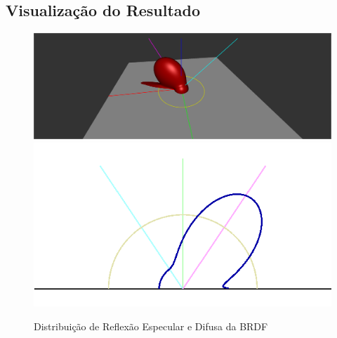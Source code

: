 \subsection{Visualização do Resultado}
\begin{figure}[H]
    \caption{\small{Distribuição de Reflexão Especular e Difusa da BRDF}}\label{fig-ward-eqlang}
    \vspace{42px}
  \includegraphics[width=\linewidth]{./Imagens/brdfs/ward-3D-plot}
\endminipage\hfill
{}
  \includegraphics[width=\linewidth]{./Imagens/brdfs/ward-polar-plot.png}
\endminipage\hfill
\end{figure}

